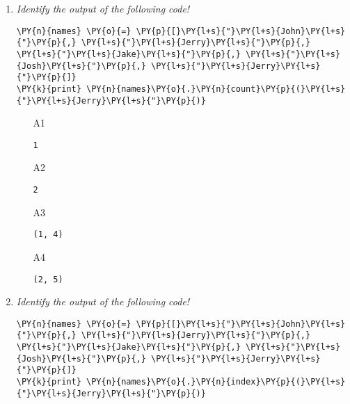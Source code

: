 \begin{enumerate}
\vspace{6mm}

\item {\em Identify the output of the following code!}\\

\begin{Verbatim}[commandchars=\\\{\}]
\PY{n}{names} \PY{o}{=} \PY{p}{[}\PY{l+s}{"}\PY{l+s}{John}\PY{l+s}{"}\PY{p}{,} \PY{l+s}{"}\PY{l+s}{Jerry}\PY{l+s}{"}\PY{p}{,} \PY{l+s}{"}\PY{l+s}{Jake}\PY{l+s}{"}\PY{p}{,} \PY{l+s}{"}\PY{l+s}{Josh}\PY{l+s}{"}\PY{p}{,} \PY{l+s}{"}\PY{l+s}{Jerry}\PY{l+s}{"}\PY{p}{]}
\PY{k}{print} \PY{n}{names}\PY{o}{.}\PY{n}{count}\PY{p}{(}\PY{l+s}{"}\PY{l+s}{Jerry}\PY{l+s}{"}\PY{p}{)}
\end{Verbatim}
\vspace{6mm}

\begin{enumerate}
\item[A1] 
\begin{verbatim}
1
\end{verbatim}
\item[A2] 
\begin{verbatim}
2
\end{verbatim}
\item[A3] 
\begin{verbatim}
(1, 4)
\end{verbatim}
\item[A4] 
\begin{verbatim}
(2, 5)
\end{verbatim}
\end{enumerate}

\vspace{6mm}

\item {\em Identify the output of the following code!}\\

\begin{Verbatim}[commandchars=\\\{\}]
\PY{n}{names} \PY{o}{=} \PY{p}{[}\PY{l+s}{"}\PY{l+s}{John}\PY{l+s}{"}\PY{p}{,} \PY{l+s}{"}\PY{l+s}{Jerry}\PY{l+s}{"}\PY{p}{,} \PY{l+s}{"}\PY{l+s}{Jake}\PY{l+s}{"}\PY{p}{,} \PY{l+s}{"}\PY{l+s}{Josh}\PY{l+s}{"}\PY{p}{,} \PY{l+s}{"}\PY{l+s}{Jerry}\PY{l+s}{"}\PY{p}{]}
\PY{k}{print} \PY{n}{names}\PY{o}{.}\PY{n}{index}\PY{p}{(}\PY{l+s}{"}\PY{l+s}{Jerry}\PY{l+s}{"}\PY{p}{)}
\end{Verbatim}
\vspace{6mm}


\end{enumerate}
